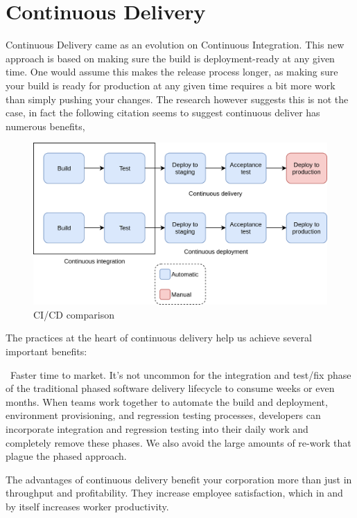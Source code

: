\section{Continuous Delivery}
Continuous Delivery came as an evolution on Continuous Integration. This new approach is based on making sure the build is deployment-ready at any given time. One would assume this makes the release process longer, as making sure your build is ready for production at any given time requires a bit more work than simply pushing your changes. The research however suggests this is not the case, in fact the following citation seems to suggest continuous deliver has numerous benefits,

\begin{figure}[h!]
  \includegraphics[width=\linewidth,height=\textheight,keepaspectratio]{images/ci_cd_comparison.png}
  \caption{CI/CD comparison}
  \label{fig:CI/CD-comparison}
\end{figure}

\begin{displayquote}
    The practices at the heart of continuous delivery help us achieve several important benefits:
    
    \textbullet ~Faster time to market. It’s not uncommon for the integration and test/fix phase of the traditional phased software delivery lifecycle to consume weeks or even months. When teams work together to automate the build and deployment, environment provisioning, and regression testing processes, developers can incorporate integration and regression testing into their daily work and completely remove these phases. We also avoid the large amounts of re-work that plague the phased approach\cite{continuousdeliveryfaster}.
\end{displayquote}

The advantages of continuous delivery benefit your corporation more than just in throughput and profitability. They increase employee satisfaction, which in and by itself increases worker productivity\cite{happy}.

